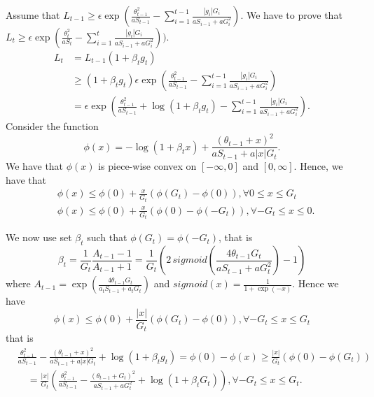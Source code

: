 Assume that $L_{t-1}\geq \epsilon \exp(\frac{\theta_{t-1}^2}{a S_{t-1}}- \sum_{i=1}^{t-1} \frac{|g_i| G_i}{a S_{i-1} + a G^2_i})$.
We have to prove that $L_{t}\geq \epsilon \exp(\frac{\theta_{t}^2}{a S_t}- \sum_{i=1}^{t} \frac{|g_i| G_i}{a S_{i-1} + a G^2_i}))$.
\begin{align}
L_{t} &= L_{t-1} (1+\beta_t g_t) \\
&\geq (1+\beta_t g_t) \epsilon \exp(\frac{\theta_{t-1}^2}{a S_{t-1}}- \sum_{i=1}^{t-1} \frac{|g_i| G_i}{a S_{i-1} + a G^2_i}) \\
&=  \epsilon \exp(\frac{\theta_{t-1}^2}{a S_{t-1}}+\log(1+\beta_t g_t)- \sum_{i=1}^{t-1} \frac{|g_i| G_i}{a S_{i-1} + a G^2_i}) .
\end{align}
Consider the function 
\[
\phi(x)=-\log(1+\beta_t x) + \frac{(\theta_{t-1}+x)^2}{a S_{t-1} + a |x| G_t}.
\]
We have that $\phi(x)$ is piece-wise convex on $[-\infty,0]$ and $[0,\infty]$. Hence, we have that
\begin{align}
&\phi(x) \leq \phi(0)+\frac{x}{G_t} (\phi(G_t)-\phi(0)), \forall 0 \leq x\leq G_t\\
&\phi(x) \leq \phi(0)+\frac{x}{G_t} (\phi(0)-\phi(-G_t)), \forall -G_t \leq x\leq 0.
\end{align}

We now use set $\beta_t$ such that $\phi(G_t)=\phi(-G_t)$, that is
\[
\beta_t = \frac{1}{G_t} \frac{A_{t-1}-1}{A_{t-1}+1} 
= \frac{1}{G_t} \left(2 \, sigmoid\left(\frac{4 \theta_{t-1} G_t}{a S_{t-1} + a G_t^2}\right)-1\right)
\]
where $A_{t-1}=\exp\left(\frac{4 \theta_{t-1} G_t}{a_{t} S_{t-1} + a_t G_t}\right)$ and
$sigmoid (x) =\frac{1}{1+\exp(-x)}$.
Hence we have
\[
\phi(x) \leq \phi(0)+\frac{|x|}{G_t} (\phi(G_t)-\phi(0)), \forall -G_t \leq x\leq G_t
\]
that is
\begin{align}
&\frac{\theta_{t-1}^2}{a S_{t-1}}-\frac{(\theta_{t-1}+x)^2}{a S_{t-1} + a |x| G_t} + \log(1+\beta_t g_t) = \phi(0) - \phi(x) 
\geq \frac{|x|}{G_t} (\phi(0) - \phi(G_t)) \\
&\quad = \frac{|x|}{G_t} (\frac{\theta_{t-1}^2}{a S_{t-1}} - \frac{(\theta_{t-1}+G_t)^2}{a S_{t-1} + a G_t^2} + \log(1+\beta_t G_t)), \forall -G_t \leq x\leq G_t.
\end{align}

